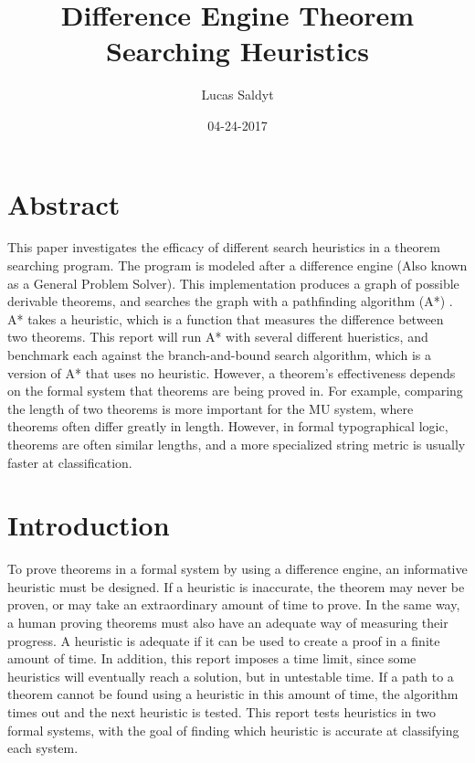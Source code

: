 \documentclass{article}
\title{Difference Engine Theorem Searching Heuristics}
\date{04-24-2017}
\author{Lucas Saldyt}
\begin{document}
\maketitle
{}
\newpage
{}

\section{Abstract}

    This paper investigates the efficacy of different search heuristics in a theorem searching program. 
The program is modeled after a difference engine (Also known as a General Problem Solver)\cite{gps}. 
This implementation produces a graph of possible derivable theorems, and searches the graph with a pathfinding algorithm (A*) \cite{astar}. 
A* takes a heuristic, which is a function that measures the difference between two theorems.
This report will run A* with several different hueristics, and benchmark each against the branch-and-bound search algorithm, which is a version of A* that uses no heuristic. 
However, a theorem's effectiveness depends on the formal system that theorems are being proved in.
For example, comparing the length of two theorems is more important for the MU system, where theorems often differ greatly in length.
However, in formal typographical logic, theorems are often similar lengths, and a more specialized string metric is usually faster at classification.

\section{Introduction}

    To prove theorems in a formal system by using a difference engine, an informative heuristic must be designed.
If a heuristic is inaccurate, the theorem may never be proven, or may take an extraordinary amount of time to prove.
In the same way, a human proving theorems must also have an adequate way of measuring their progress.
A heuristic is adequate if it can be used to create a proof in a finite amount of time. 
In addition, this report imposes a time limit, since some heuristics will eventually reach a solution, but in untestable time.
If a path to a theorem cannot be found using a heuristic in this amount of time, the algorithm times out and the next heuristic is tested.
This report tests heuristics in two formal systems, with the goal of finding which heuristic is accurate at classifying each system.
\end{document}
